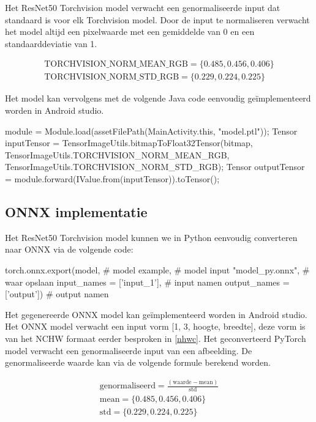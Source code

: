Het ResNet50 Torchvision model verwacht een genormaliseerde input dat standaard is voor elk Torchvision model.
Door de input te normaliseren verwacht het model altijd een pixelwaarde met een gemiddelde van 0 en een standaarddeviatie van 1.

\begin{equation}
    \begin{aligned}
	\textrm{TORCHVISION\_NORM\_MEAN\_RGB}  = \{0.485, 0.456, 0.406\} \\
	\textrm{TORCHVISION\_NORM\_STD\_RGB}  = \{0.229, 0.224, 0.225\}
    \end{aligned}
\end{equation}

Het model kan vervolgens met de volgende Java code eenvoudig ge\"implementeerd worden in Android studio. 

\begin{python}
module = Module.load(assetFilePath(MainActivity.this, "model.ptl"));
Tensor inputTensor = TensorImageUtils.bitmapToFloat32Tensor(bitmap,
            TensorImageUtils.TORCHVISION_NORM_MEAN_RGB, 
            TensorImageUtils.TORCHVISION_NORM_STD_RGB);
Tensor outputTensor = module.forward(IValue.from(inputTensor)).toTensor();
\end{python}

\subsection{ONNX implementatie} \label{py_onnx}
Het ResNet50 Torchvision model kunnen we in Python eenvoudig converteren naar ONNX via de volgende code:

\begin{python}
torch.onnx.export(model, # model 
    example,             # model input
    "model_py.onnx",     # waar opslaan
    input_names = ['input_1'], # input namen
    output_names = ['output']) # output namen    
\end{python}

Het gegenereerde ONNX model kan ge\"implementeerd worden in Android studio.
Het ONNX model verwacht een input vorm [1, 3, hoogte, breedte], deze vorm is van het NCHW formaat eerder besproken in \ref{nhwc}.
Het geconverteerd PyTorch model verwacht een genormaliseerde input van een afbeelding.
De genormaliseerde waarde kan via de volgende formule berekend worden.

\begin{equation}
    \begin{aligned}
	\textrm{genormaliseerd}  = \frac{(\textrm{waarde} - \textrm{mean})}{\textrm{std}} \\
    \textrm{mean}  = \{0.485, 0.456, 0.406\} \\
	\textrm{std}  = \{0.229, 0.224, 0.225\}
\end{aligned}
\end{equation}

